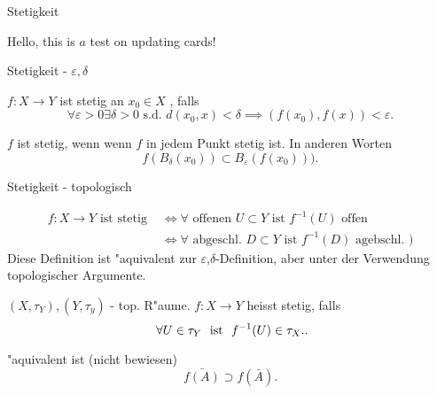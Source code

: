 \documentclass[class=article, crop=false]{standalone}
\begin{document}
\begin{zettel}{Stetigkeit}
\begin{flashcard}

    Hello, this is $a$ test on updating cards!

\begin{question}
    Stetigkeit - $\varepsilon, \delta $ 
\end{question}

\begin{definition}[Stetigkeit]
    $f:X \longrightarrow Y$ ist stetig an $x_0 \in  X$ , falls
\[
    \forall \varepsilon >  0 \exists  \delta  > 0 \text{ s.d. }  d (x_0 , x) < \delta \implies (f (x_0), f (x)) <  \varepsilon
.\]

    $f$ ist stetig, wenn wenn $f$ in jedem Punkt stetig ist.
    In anderen Worten
\[
    f (B_{\delta }(x_0)) \subset B_{\varepsilon } (f (x_0)) )
.\]
\end{definition}
\end{flashcard}

\begin{flashcard}
\begin{question}
    Stetigkeit - topologisch
\end{question}
\begin{definition}[Stetigkeit]
\begin{align*}
    f:X \longrightarrow Y \text{ ist stetig }  &\iff \forall \text{ offenen } U \subset Y \text{ ist } f^{-1} (U) \text{ offen } \\
                                               &\iff \forall  \text{ abgeschl. } D \subset Y \text{ ist } f^{-1} (D) \text{ agebschl. } )
\end{align*}
    Diese Definition ist "aquivalent zur $\varepsilon $,$\delta$-Definition, aber unter der Verwendung topologischer Argumente.
\end{definition}
\end{flashcard}

\begin{definition}[Stetigkeit]
   $(X, \tau_Y), (Y, \tau_y)$  - top. R"aume. $f:X \longrightarrow Y$ heisst stetig, falls
   \[
       \forall U \in  \tau_Y \tx{ ist } f^{-1} (U) \in  \tau_X.
   .\]
\end{definition}

"aquivalent ist (nicht bewiesen)
\[
    \bar{f(A)} \supset f (\bar{A}) 
.\]

\end{zettel}
\end{document}
